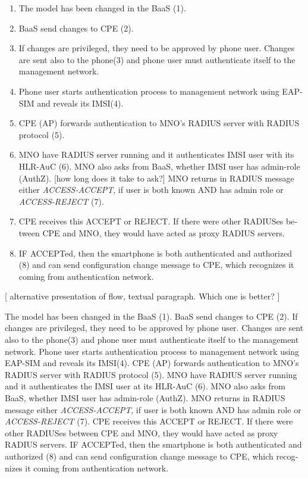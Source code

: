 \documentclass[12pt,a4paper,english]{tutthesis}
\begin{document}
\begin{otherlanguage}{english}
\begin{enumerate}
\item The model has been changed in the BaaS (1).
\item BaaS send changes to CPE (2).
\item If changes are privileged, they need to be approved by phone user.
Changes are sent also to the phone(3) and phone user must authenticate
itself to the management network.
\item Phone user starts authentication process to management
network using EAP-SIM and reveals its IMSI(4).
\item CPE  (AP) forwards authentication to MNO's RADIUS server with
RADIUS protocol (5).
\item MNO have RADIUS server running and it authenticates IMSI user with
  its HLR-AuC (6).
MNO also asks from BaaS, whether IMSI user has admin-role (AuthZ). [how long does it take to ask?]
MNO returns in RADIUS message either \emph{ACCESS-ACCEPT}, if user is both known AND has admin role 
  or \emph{ACCESS-REJECT} (7).
\item CPE receives this ACCEPT or REJECT. If there were other RADIUSes
between CPE and MNO, they would have acted
as proxy RADIUS servers.
\item IF ACCEPTed, then the smartphone is both authenticated and authorized (8) and
can send configuration change message to CPE, which recognizes it
coming from authentication network.
\end{enumerate}



[ alternative presentation of flow, textual paragraph. Which one is better? ] 

The model has been changed in the BaaS (1). BaaS send changes to CPE
(2).  If changes are privileged, they need to be approved by phone
user.  Changes are sent also to the phone(3) and phone user must
authenticate itself to the management network.  Phone user starts
authentication process to management network using EAP-SIM and reveals
its IMSI(4).  CPE (AP) forwards authentication to MNO's RADIUS server
with RADIUS protocol (5).  MNO have RADIUS server running and it
authenticates the IMSI user at its HLR-AuC (6). MNO also asks from
BaaS, whether IMSI user has admin-role (AuthZ). 
MNO returns in RADIUS message either \emph{ACCESS-ACCEPT}, if
user is both known AND has admin role or \emph{ACCESS-REJECT} (7).  CPE
receives this ACCEPT or REJECT. If there were other RADIUSes between
CPE and MNO, they would have acted as proxy RADIUS servers.  IF
ACCEPTed, then the smartphone is both authenticated and authorized (8) and can
send configuration change message to CPE, which recognizes it coming
from authentication network.


\end{otherlanguage}
\end{document}
